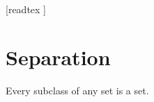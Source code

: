 \documentclass[10pt]{article}
\begin{document}
  \begin{imports}
    \begin{forthel}
      [readtex ]
    \end{forthel}
  \end{imports}


  \section{Separation}

  \begin{forthel}
    \begin{axiom}[title=Separation Axiom,id=FOUNDATIONS_10_2263707272871936,printid]
      Every subclass of any set is a set.
    \end{axiom}
  \end{forthel}
\end{document}
